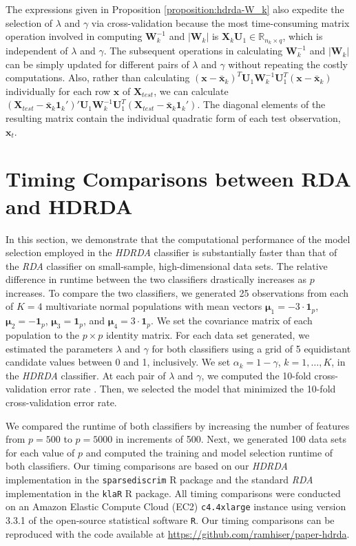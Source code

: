 \documentclass[]{interact}\usepackage[]{graphicx}\usepackage[]{color}
\newcommand{\xbar}{\bar{\bm x}}
\begin{document}
The expressions given in Proposition \ref{proposition:hdrda-W_k} also expedite
the selection of $\lambda$ and $\gamma$ via cross-validation because the most
time-consuming matrix operation involved in computing $\bm W_k^{-1}$ and $|\bm
W_k|$ is $\bm X_k \bm U_1 \in \mathbb{R}_{n_k \times q}$, which is independent
of $\lambda$ and $\gamma$. The subsequent operations in calculating $\bm
W_k^{-1}$ and $|\bm W_k|$ can be simply updated for different pairs of $\lambda$
and $\gamma$ without repeating the costly computations. Also, rather than calculating
$(\bm x - \xbar_k)^{T} \bm U_1 \bm W_k^{-1} \bm U_1^{T} (\bm x - \xbar_k)$
individually for each row $\bm x$ of $\bm X_{test}$, we can calculate $(\bm
X_{test} - \xbar_k \bm 1_k')' \bm U_1 \bm W_k^{-1} \bm U_1^{T} (\bm X_{test} -
\xbar_k \bm 1_k')$. The diagonal elements of the resulting matrix contain the
individual quadratic form of each test observation, $\bm x_t$.

\section{Timing Comparisons between RDA and HDRDA}
\label{sec:timing-comparisons}

In this section, we demonstrate that the computational performance of the model
selection employed in the \emph{HDRDA} classifier is substantially faster than
that of the \emph{RDA} classifier on small-sample, high-dimensional data
sets. The relative difference in runtime between the two classifiers drastically
increases as $p$ increases. To compare the two classifiers, we generated 25
observations from each of $K=4$ multivariate normal populations with mean
vectors $\bm \mu_1 = -3 \cdot \bm 1_p$, $\bm \mu_2 = -\bm 1_p$, $\bm \mu_3 = \bm
1_p$, and $\bm \mu_4 = 3 \cdot \bm 1_p$. We set the covariance matrix of each
population to the $p \times p$ identity matrix. For each data set generated, we
estimated the parameters $\lambda$ and $\gamma$ for both classifiers using a
grid of 5 equidistant candidate values between 0 and 1, inclusively. We set
$\alpha_k = 1 - \gamma$, $k = 1, \ldots, K$, in the \emph{HDRDA} classifier. At
each pair of $\lambda$ and $\gamma$, we computed the 10-fold cross-validation
error rate \citep{Hastie:2008dt}. Then, we selected the model that minimized the
10-fold cross-validation error rate.

We compared the runtime of both classifiers by increasing the number of features
from $p = 500$ to $p = 5000$ in increments of 500. Next, we generated 100 data
sets for each value of $p$ and computed the training and model selection runtime
of both classifiers. Our timing comparisons are based on our \emph{HDRDA}
implementation in the {\tt sparsediscrim} R package and the standard \emph{RDA}
implementation in the {\tt klaR} R package. All timing comparisons were
conducted on an Amazon Elastic Compute Cloud (EC2) {\tt c4.4xlarge} instance
using version 3.3.1 of the open-source statistical software {\tt R}. Our timing
comparisons can be reproduced with the code available at
\url{https://github.com/ramhiser/paper-hdrda}.
\end{document}
